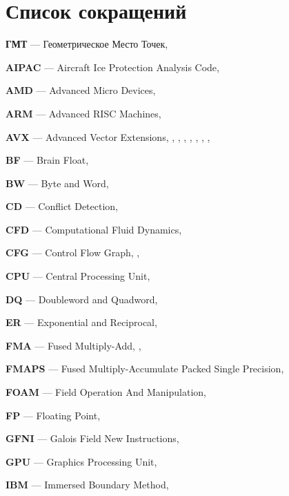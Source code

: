 \newpage

\section*{Список сокращений}

\textbf{ГМТ} --- Геометрическое Место Точек, \pageref{abbr:gmt}

\textbf{AIPAC} --- Aircraft Ice Protection Analysis Code, \pageref{abbr:aipac}

\textbf{AMD} --- Advanced Micro Devices, \pageref{abbr:amd}

\textbf{ARM} --- Advanced RISC Machines, \pageref{abbr:arm}

\textbf{AVX} --- Advanced Vector Extensions, \pageref{abbr:avx}, \pageref{abbr:avx2}, \pageref{abbr:avx3}, \pageref{abbr:avx4}, \pageref{abbr:avx5}, \pageref{abbr:avx6}, \pageref{abbr:avx7}, \pageref{abbr:avx8}

\textbf{BF} --- Brain Float, \pageref{abbr:bf}

\textbf{BW} --- Byte and Word, \pageref{abbr:bw}

\textbf{CD} --- Conflict Detection, \pageref{abbr:cd}

\textbf{CFD} --- Computational Fluid Dynamics, \pageref{abbr:cfd}

\textbf{CFG} --- Control Flow Graph, \pageref{abbr:cfg}, \pageref{abbr:cfg2}

\textbf{CPU} --- Central Processing Unit, \pageref{abbr:cpu}

\textbf{DQ} --- Doubleword and Quadword, \pageref{abbr:dq}

\textbf{ER} --- Exponential and Reciprocal, \pageref{abbr:er}

\textbf{FMA} --- Fused Multiply-Add, \pageref{abbr:fma}, \pageref{abbr:fma2}

\textbf{FMAPS} --- Fused Multiply-Accumulate Packed Single Precision, \pageref{abbr:fmaps}
 
\textbf{FOAM} --- Field Operation And Manipulation, \pageref{abbr:foam} 
 
\textbf{FP} --- Floating Point, \pageref{abbr:fp}

\textbf{GFNI} --- Galois Field New Instructions, \pageref{abbr:gfni}

\textbf{GPU} --- Graphics Processing Unit, \pageref{abbr:gpu}

\textbf{IBM} --- Immersed Boundary Method, \pageref{abbr:ibm}

